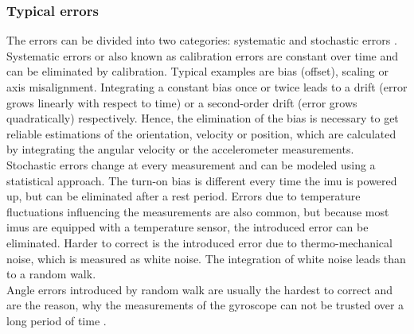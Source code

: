 \subsubsection{Typical  errors}
\label{sse:mems_errors}
The errors can be divided into two categories: systematic and stochastic errors \cite{Zhang2019}.
Systematic errors or also known as calibration errors are constant over time and can be eliminated by calibration.
Typical examples are bias (offset), scaling or axis misalignment.
Integrating a constant bias once or twice leads to a drift (error grows linearly with respect to time) or a second-order drift (error grows quadratically) respectively.
Hence, the elimination of the bias is necessary to get reliable estimations of the orientation, velocity or position, which are calculated by integrating the angular velocity or the accelerometer measurements.\\
Stochastic errors change at every measurement and can be modeled using a statistical approach.
The turn-on bias is different every time the \gls{imu} is powered up, but can be eliminated after a rest period.
Errors due to temperature fluctuations influencing the measurements are also common, but because most \gls{imu}s are equipped with a temperature sensor, the introduced error can be eliminated.
Harder to correct is the introduced error due to thermo-mechanical noise, which is measured as white noise.
The integration of white noise leads than to a random walk.\\
Angle errors introduced by random walk are usually the hardest to correct and are the reason, why the measurements of the gyroscope can not be trusted over a long period of time \cite{Woodman2007}.


